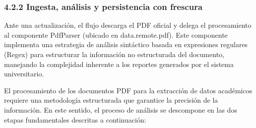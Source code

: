 \subsubsection{4.2.2 Ingesta, análisis y persistencia con frescura}
Ante una actualización, el flujo descarga el PDF oficial y delega el procesamiento al componente PdfParser (ubicado en data.remote.pdf). Este componente implementa una estrategia de análisis sintáctico basada en expresiones regulares (Regex) para estructurar la información no estructurada del documento, manejando la complejidad inherente a los reportes generados por el sistema universitario.

El procesamiento de los documentos PDF para la extracción de datos académicos requiere una metodología estructurada que garantice la precisión de la información. En este sentido, el proceso de análisis se descompone en las dos etapas fundamentales descritas a continuación:
